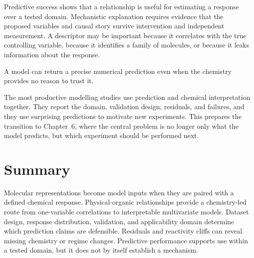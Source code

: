 Predictive success shows that a relationship is useful for estimating a response over a tested domain.
Mechanistic explanation requires evidence that the proposed variables and causal story survive intervention and independent measurement.
A descriptor may be important because it correlates with the true controlling variable, because it identifies a family of molecules, or because it leaks information about the response.

\begin{warningbox}
  A model can return a precise numerical prediction even when the chemistry provides no reason to trust it.
\end{warningbox}

The most productive modelling studies use prediction and chemical interpretation together.
They report the domain, validation design, residuals, and failures, and they use surprising predictions to motivate new experiments.
This prepares the transition to Chapter~6, where the central problem is no longer only what the model predicts, but which experiment should be performed next.

\section{Summary}

Molecular representations become model inputs when they are paired with a defined chemical response.
Physical-organic relationships provide a chemistry-led route from one-variable correlations to interpretable multivariate models.
Dataset design, response distribution, validation, and applicability domain determine which prediction claims are defensible.
Residuals and reactivity cliffs can reveal missing chemistry or regime changes.
Predictive performance supports use within a tested domain, but it does not by itself establish a mechanism.
